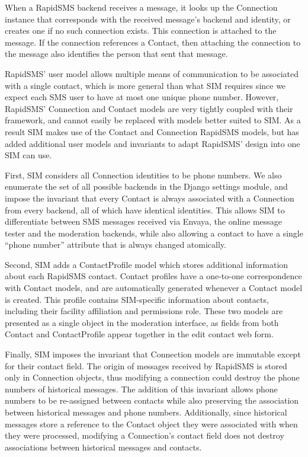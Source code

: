 \documentclass{acm_proc_article-sp}
\begin{document}
When a RapidSMS backend receives a message, it looks up the Connection instance that corresponds with the received message's backend and identity, or creates one if no such connection exists. This connection is attached to the message. If the connection references a Contact, then attaching the connection to the message also identifies the person that sent that message.

RapidSMS' user model allows multiple means of communication to be associated with a single contact, which is more general than what SIM requires since we expect each SMS user to have at most one unique phone number. However, RapidSMS' Connection and Contact models are very tightly coupled with their framework, and cannot easily be replaced with models better suited to SIM. As a result SIM makes use of the Contact and Connection RapidSMS models, but has added additional user models and invariants to adapt RapidSMS' design into one SIM can use.

First, SIM considers all Connection identities to be phone numbers. We also enumerate the set of all possible backends in the Django settings module, and impose the invariant that every Contact is always associated with a Connection from every backend, all of which have identical identities. This allows SIM to differentiate between SMS messages received via Envaya, the online message tester and the moderation backends, while also allowing a contact to have a single ``phone number'' attribute that is always changed atomically.

Second, SIM adds a ContactProfile model which stores additional information about each RapidSMS contact. Contact profiles have a one-to-one correspondence with Contact models, and are automatically generated whenever a Contact model is created. This profile contains SIM-specific information about contacts, including their facility affiliation and permissions role. These two models are presented as a single object in the moderation interface, as fields from both Contact and ContactProfile appear together in the edit contact web form.

Finally, SIM imposes the invariant that Connection models are immutable except for their contact field. The origin of messages received by RapidSMS is stored only in Connection objects, thus modifying a connection could destroy the phone numbers of historical messages. The addition of this invariant allows phone numbers to be re-assigned between contacts while also preserving the association between historical messages and phone numbers. Additionally, since historical messages store a reference to the Contact object they were associated with when they were processed, modifying a Connection's contact field does not destroy associations between historical messages and contacts.
\end{document}

